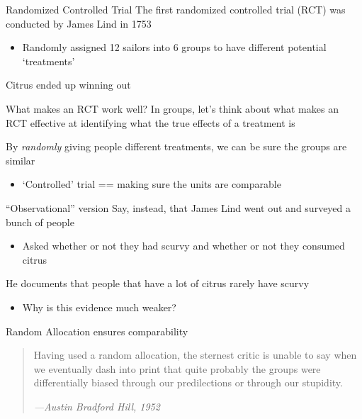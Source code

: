 \documentclass[aspectratio=169,t,11pt,table]{beamer}
\begin{document}
\begin{frame}{Randomized Controlled Trial}
  The first randomized controlled trial (RCT) was conducted by James Lind in 1753
  \begin{itemize}
    \item Randomly assigned 12 sailors into 6 groups to have different potential `treatments'
  \end{itemize}

  \bigskip
  Citrus ended up winning out
\end{frame}

\begin{frame}{What makes an RCT work well?}
  In groups, let's think about what makes an RCT effective at identifying what the true effects of a treatment is

  \pause
  By \emph{randomly} giving people different treatments, we can be sure the groups are similar
  \begin{itemize}
    \item `Controlled' trial == making sure the units are comparable
  \end{itemize}
\end{frame}

\begin{frame}{``Observational'' version}
  Say, instead, that James Lind went out and surveyed a bunch of people
  \begin{itemize}
    \item Asked whether or not they had scurvy and whether or not they consumed citrus
  \end{itemize}
  
  \bigskip
  He documents that people that have a lot of citrus rarely have scurvy
  \begin{itemize}
    \item Why is this evidence much weaker? 
  \end{itemize}
\end{frame}

\begin{frame}{Random Allocation ensures comparability}
  \bigskip
  \begin{quote}
    Having used a random allocation, the sternest critic is unable to say when we eventually dash into print that quite probably the groups were differentially biased through our predilections or through our stupidity.

    \emph{—Austin Bradford Hill, 1952}
  \end{quote}
\end{frame}
\end{document}
